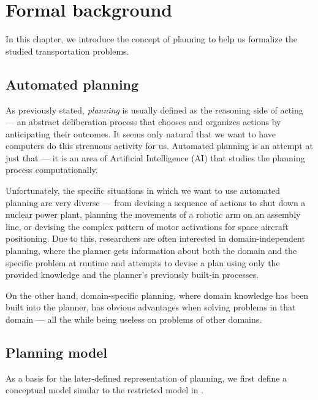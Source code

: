 \chapter{Formal background}

In this chapter, we introduce the concept of planning to help us  formalize the studied transportation problems.

\section{Automated planning}

As previously stated, \textit{planning} is usually defined as the reasoning side of acting --- an abstract deliberation
process that chooses and organizes actions by anticipating their outcomes. \citep[Section~1.1]{Ghallab2004}
It seems only natural that we want to have computers do this strenuous activity for us.
Automated planning is an attempt at just that --- it is an area of Artificial Intelligence (AI) that
studies the planning process computationally. \citep[Section~1.1]{Ghallab2004}

Unfortunately, the specific situations in which we want to use automated planning are very diverse
--- from devising a sequence of actions to shut down a nuclear power plant,
planning the movements of a robotic arm
on an assembly line, or devising the complex pattern of motor activations
for space aircraft positioning.
Due to this, researchers are often interested in domain-independent planning,
where the planner gets information
about both the domain and the specific problem at runtime and attempts to devise a plan using only the provided knowledge
and the planner's previously built-in processes. \citep[Section~1.3]{Ghallab2004}

On the other hand, domain-specific planning, where domain knowledge has been built into the planner,
has obvious advantages when solving problems in that domain --- all the while being useless on problems of other
domains. \citep[Section~1.3]{Ghallab2004}

\section{Planning model}

As a basis for the later-defined representation of planning, we first define
a conceptual model similar to the restricted model in \citep[Section~1.4, Section~1.5]{Ghallab2004}.


